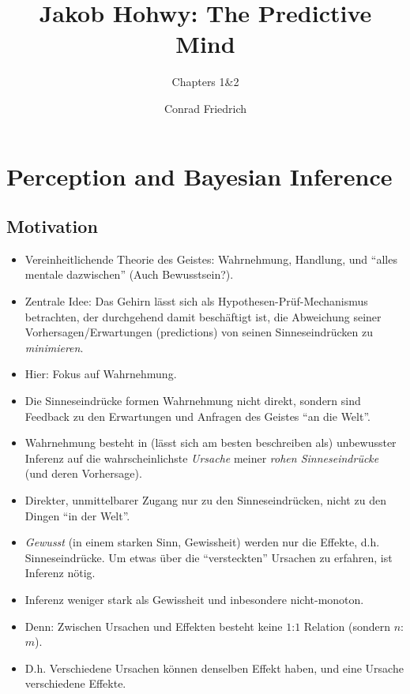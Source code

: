 \documentclass[11pt, handout]{beamer}
\title[Hohwy: The Predictive Mind]{Jakob Hohwy: The Predictive Mind}
\subtitle{Chapters 1\&2}
\author{Conrad Friedrich}
\institute[Uni Köln]{Universität zu Köln}
\begin{document}
\begin{frame}[plain]
  \maketitle
\end{frame}

\section{Perception and Bayesian Inference}

\subsection{Motivation}

\begin{frame}
  \begin{itemize}[<+->]
  \item Vereinheitlichende Theorie des Geistes: Wahrnehmung, Handlung,
    und ``alles mentale dazwischen'' (Auch Bewusstsein?).
  \item Zentrale Idee: Das Gehirn lässt sich als
    Hypothesen-Prüf-Mechanismus betrachten, der durchgehend damit
    beschäftigt ist, die Abweichung seiner Vorhersagen/Erwartungen
    (predictions) von seinen Sinneseindrücken zu \emph{minimieren}.
  \item Hier: Fokus auf Wahrnehmung.
  \item Die Sinneseindrücke formen Wahrnehmung nicht direkt, sondern
    sind Feedback zu den Erwartungen und Anfragen des Geistes ``an die
    Welt''.
  \end{itemize}
\end{frame}

\begin{frame}
  \begin{itemize}[<+->]
  \item Wahrnehmung besteht in (lässt sich am besten beschreiben als)
    unbewusster Inferenz auf die wahrscheinlichste \emph{Ursache}
    meiner \emph{rohen Sinneseindrücke} (und deren Vorhersage).
  \item Direkter, unmittelbarer Zugang nur zu den Sinneseindrücken,
    nicht zu den Dingen ``in der Welt''.
  \item \emph{Gewusst} (in einem starken Sinn, Gewissheit) werden nur
    die Effekte, d.h. Sinneseindrücke. Um etwas über die
    ``versteckten'' Ursachen zu erfahren, ist Inferenz nötig.
  \item Inferenz weniger stark als Gewissheit und inbesondere
    nicht-monoton.
  \item Denn: Zwischen Ursachen und Effekten besteht keine $1$:$1$
    Relation (sondern $n$:$m$).
  \item D.h. Verschiedene Ursachen können denselben Effekt haben, und
    eine Ursache verschiedene Effekte.
  \end{itemize}
\end{frame}
\end{document}
